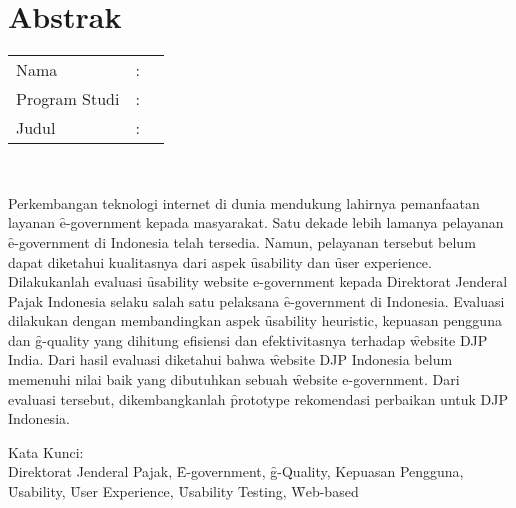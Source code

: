 %
%
%

\chapter*{Abstrak}

\vspace*{0.2cm}

\noindent \begin{tabular}{l l p{10cm}}
	Nama&: & \penulis \\
	Program Studi&: & \program \\
	Judul&: & \judul \\
\end{tabular} \\ 

\vspace*{0.5cm}

\noindent 
Perkembangan teknologi internet di dunia mendukung lahirnya pemanfaatan layanan \f{e-government} kepada masyarakat. Satu dekade lebih lamanya pelayanan \f{e-government} di Indonesia telah tersedia. Namun, pelayanan tersebut belum dapat diketahui kualitasnya dari aspek \f{usability} dan \f{user experience}. Dilakukanlah evaluasi \f{usability website e-government} kepada Direktorat Jenderal Pajak Indonesia selaku salah satu pelaksana \f{e-government} di Indonesia. Evaluasi dilakukan dengan membandingkan aspek \f{usability heuristic}, kepuasan pengguna dan \f{g-quality} yang dihitung efisiensi dan efektivitasnya terhadap \f{website} DJP India. Dari hasil evaluasi diketahui bahwa \f{website} DJP Indonesia belum memenuhi nilai baik yang dibutuhkan sebuah \f{website e-government}. Dari evaluasi tersebut, dikembangkanlah \f{prototype} rekomendasi perbaikan untuk DJP Indonesia.
\vspace*{0.2cm}

\noindent Kata Kunci: \\ 
\noindent Direktorat Jenderal Pajak, \f{E-government}, \f{g-Quality}, Kepuasan Pengguna, \f{Usability}, \f{User Experience}, \f{Usability Testing}, \f{Web-based}\\ 

\newpage